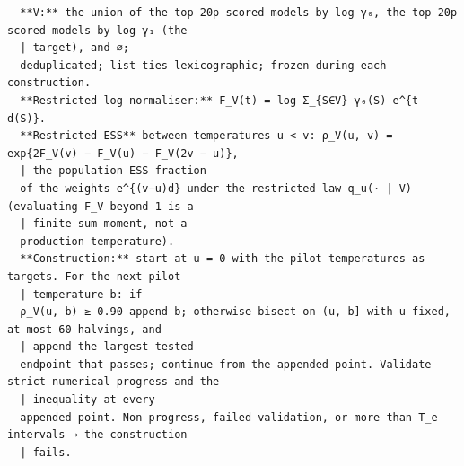 \documentclass[11pt]{article}
\theoremstyle{remark}
\begin{document}
\begin{Verbatim}[fontsize=\footnotesize,formatcom=\qfont]
- **V:** the union of the top 20p scored models by log γ₀, the top 20p scored models by log γ₁ (the
  | target), and ∅;
  deduplicated; list ties lexicographic; frozen during each construction.
- **Restricted log-normaliser:** F_V(t) = log Σ_{S∈V} γ₀(S) e^{t d(S)}.
- **Restricted ESS** between temperatures u < v: ρ_V(u, v) = exp{2F_V(v) − F_V(u) − F_V(2v − u)},
  | the population ESS fraction
  of the weights e^{(v−u)d} under the restricted law q_u(· | V) (evaluating F_V beyond 1 is a
  | finite-sum moment, not a
  production temperature).
- **Construction:** start at u = 0 with the pilot temperatures as targets. For the next pilot
  | temperature b: if
  ρ_V(u, b) ≥ 0.90 append b; otherwise bisect on (u, b] with u fixed, at most 60 halvings, and
  | append the largest tested
  endpoint that passes; continue from the appended point. Validate strict numerical progress and the
  | inequality at every
  appended point. Non-progress, failed validation, or more than T_e intervals → the construction
  | fails.
\end{Verbatim}
\end{document}
